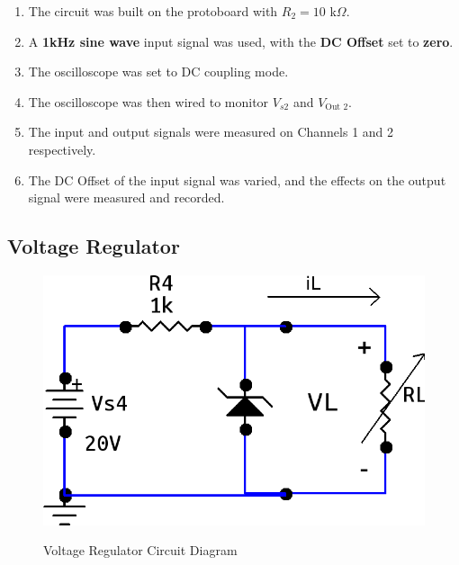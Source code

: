 \documentclass[twocolumn,english]{IEEEtran}
\begin{document}
  \begin{enumerate}
   \item The circuit was built on the protoboard with $R_2 = 10$ k$\Omega$. %
   \item A \textbf{1kHz sine wave} input signal was used, with the \textbf{DC Offset} set to \textbf{zero}.
   \item The oscilloscope was set to DC coupling mode. %
   \item The oscilloscope was then wired to monitor $V_{s2}$ and $V_{\text{Out 2}}$.
   \item The input and output signals were measured on Channels 1 and 2 respectively. %
   \item The DC Offset of the input signal was varied, and the effects on the output signal were measured and recorded.
  \end{enumerate}

\subsection{Voltage Regulator}
\begin{figure}[h]
  \begin{centering}
  \begin{center}
  \includegraphics[width=\linewidth]{./3.png}
  \label{fig:circuit_3}
  \caption{Voltage Regulator Circuit Diagram}
  \end{center}
  \par\end{centering}
  \end{figure}
\end{document}
